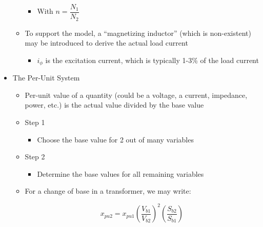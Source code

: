 \begin{itemize}
\begin{itemize}
        \begin{itemize}

          \item With $n=\dfrac{N_1}{N_2}$

        \end{itemize}

      \item To support the model, a ``magnetizing inductor'' (which is non-existent) may be introduced to derive the actual load current

        \begin{itemize}

          \item $i_{\phi}$ is the excitation current, which is typically 1-3\% of the load current

        \end{itemize}

    \end{itemize}

  \item The Per-Unit System

    \begin{itemize}

      \item Per-unit value of a quantity (could be a voltage, a current, impedance, power, etc.) is the actual value divided by the base value

      \item Step 1

        \begin{itemize}

          \item Choose the base value for 2 out of many variables

        \end{itemize}

      \item Step 2

        \begin{itemize}

          \item Determine the base values for all remaining variables

        \end{itemize}

      \item For a change of base in a transformer, we may write:

        $$x_{pu2}=x_{pu1}\left( \frac{V_{b1}}{V_{b2}} \right)^{2}\left( \frac{S_{b2}}{S_{b1}} \right)$$

    \end{itemize}

\end{itemize}



